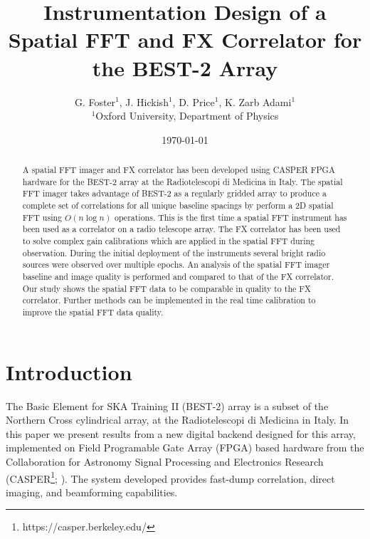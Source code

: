 \documentclass[useAMS,macros,usenatbib]{mn2e}
\title[]{Instrumentation Design of a Spatial FFT and FX Correlator for the BEST-2 Array}
\author[G. Foster, J. Hickish, D. Price and K. Zarb Adami]{G. Foster$^{1}$, J. Hickish$^{1}$, D. Price$^{1}$, K. Zarb Adami$^{1}$\\
$^{1}$Oxford University, Department of Physics}
\begin{document}
\date{\today}

\pagerange{\pageref{firstpage}--\pageref{lastpage}} 

\maketitle

\begin{abstract}
A spatial FFT imager and FX correlator has been developed using CASPER FPGA hardware for the BEST-2 array at the Radiotelescopi di Medicina in Italy.
The spatial FFT imager takes advantage of BEST-2 as a regularly gridded array to produce a complete set of correlations for all unique baseline spacings by perform a 2D spatial FFT using $O(n \log n)$ operations.
This is the first time a spatial FFT instrument has been used as a correlator on a radio telescope array.
The FX correlator has been used to solve complex gain calibrations which are applied in the spatial FFT during observation.
During the initial deployment of the instruments several bright radio sources were observed over multiple epochs.
An analysis of the spatial FFT imager baseline and image quality is performed and compared to that of the FX correlator.
Our study shows the spatial FFT data to be comparable in quality to the FX correlator.
Further methods can be implemented in the real time calibration to improve the spatial FFT data quality.
\end{abstract}

\section{Introduction}

The Basic Element for SKA Training II (BEST-2) array is a subset of the Northern Cross cylindrical array, at the Radiotelescopi di Medicina in Italy.
In this paper we present results from a new digital backend designed for this array, implemented on Field Programable Gate Array (FPGA) based hardware from the Collaboration for Astronomy Signal Processing and Electronics Research (CASPER\footnote{https://casper.berkeley.edu/}; \cite{casper}).
The system developed provides fast-dump correlation, direct imaging, and beamforming capabilities.
\end{document}
